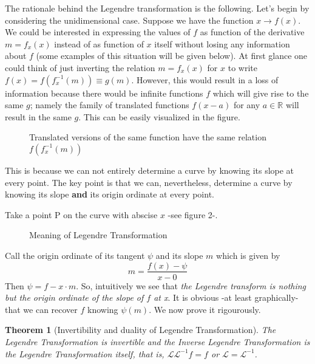 \documentclass[12pt]{article}
\newtheorem{thm}{Theorem}
\theoremstyle{definition}
\numberwithin{equation}{section}
\newcommand{\R}{\mathbb R}
\begin{document}
\medskip

\noindent The rationale behind the Legendre transformation is the
following. Let's begin by considering the unidimensional case.
Suppose we have the function $x \to f(x)$. We could be interested in
expressing the values of $f$ as function of the derivative
$m=f_x(x)$ instead of as function of $x$ itself without losing any
information about $f$ (some examples of this situation will be given
below). At first glance one could think of just inverting the
relation $m=f_x(x)$ for $x$ to write $f(x)=f(f_x^{-1}(m))\equiv
g(m)$. However, this would result in a loss of information because
there would be infinite functions $f$ which will give rise to the
same $g$; namely the family of translated functions $f(x-a)$ for any
$a \in \R$ will result in the same $g$. This can be easily
visualized in the figure.

\begin{figure}[h]
\begin{center}
 \caption{Translated
versions of the same function have the same relation
$f(f_x^{-1}(m))$} \label{fig1}
\end{center}
\end{figure}

\medskip

This is because we can not entirely determine a curve by knowing its
slope at every point. The key point is that we can, nevertheless,
determine a curve by knowing its slope \textbf{and} its origin
ordinate at every point.

\noindent Take a point P on the curve with abscise $x$ -see figure
2-.

\begin{figure}[h]
\begin{center}
 \caption{Meaning of
Legendre Transformation} \label{fig1}
\end{center}
\end{figure}

Call the origin ordinate of its tangent $\psi$ and its slope $m$
which is given by $$m=\frac{f(x)-\psi}{x-0}$$ Then $\psi=f-x\cdot
m$. So, intuitively we see that  \emph{the Legendre transform is
nothing but the origin ordinate of the slope of $f$ at x}. It is
obvious -at least graphically- that we can recover $f$ knowing
$\psi(m)$. We now prove it rigourously.

\begin{thm}[Invertibility and duality of Legendre Transformation]
The Legendre Transformation is invertible and the Inverse Legendre
Transformation is the Legendre Transformation itself, that is,
$\mathcal L \mathcal L^{-1} f = f$ or $\mathcal L=\mathcal L^{-1}$.
\end{thm}
\end{document}

